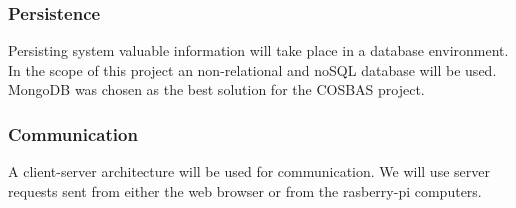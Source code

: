 \subsubsection{Persistence}
Persisting system valuable information will take place in a database environment. In the scope of this project an non-relational and noSQL database will be used. MongoDB was chosen as the best solution for the COSBAS project.

\subsubsection{Communication}
A client-server architecture will be used for communication. We will use server requests sent from either the web browser or from the rasberry-pi computers.